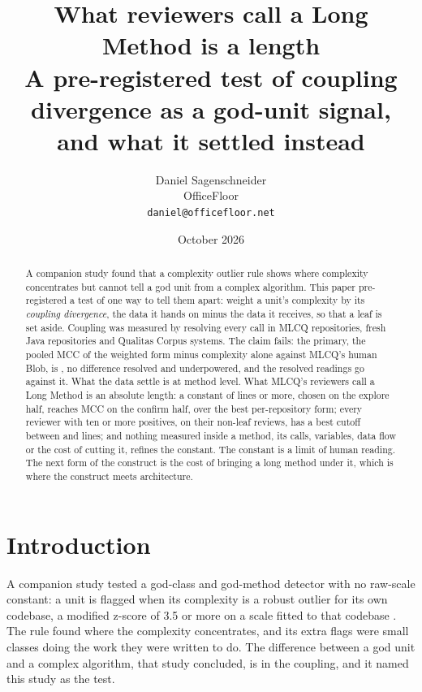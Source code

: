 \documentclass[11pt,a4paper]{article}
\title{\bfseries What reviewers call a Long Method is a length\\ A pre-registered test of coupling divergence as a god-unit signal, and what it settled instead}
\author{Daniel Sagenschneider\\\small OfficeFloor\\\small\texttt{daniel@officefloor.net}\doiline}
\date{October 2026}
\begin{document}
\maketitle

\begin{abstract}
\noindent
A companion study found that a complexity outlier rule shows where
complexity concentrates but cannot tell a god unit from a complex
algorithm. This paper pre-registered a test of one way to tell them apart:
weight a unit's complexity by its \emph{coupling divergence}, the data it
hands on minus the data it receives, so that a leaf is set aside. Coupling
was measured by resolving every call in \mlcqMeasured{} MLCQ repositories,
\seedThreeMeasured{} fresh Java repositories and \fontanaSystems{} Qualitas
Corpus systems. The claim fails: the primary, the pooled MCC of the
weighted form minus complexity alone against MLCQ's human Blob, is
\primMicro{}, no difference resolved and underpowered, and the resolved
readings go against it. What the data settle is at method level. What
MLCQ's reviewers call a Long Method is an absolute length: a constant of
\lwLengthCutoff{} lines or more, chosen on the explore half, reaches MCC
\lwLengthMccConfirm{} on the confirm half, \lwLengthVsRule{} over the best
per-repository form; every reviewer with ten or more positives, on their
non-leaf reviews, has a best cutoff between \revCutoffMin{} and
\revCutoffMax{} lines; and nothing
measured inside a method, its calls, variables, data flow or the cost of
cutting it, refines the constant. The constant is a limit of human reading.
The next form of the construct is the cost of bringing a long method under
it, which is where the construct meets architecture.
\end{abstract}

\section{Introduction}

A companion study \cite{paperone} tested a god-class and god-method
detector with no raw-scale constant: a unit is flagged when its complexity
is a robust outlier for its own codebase, a modified z-score of 3.5 or more
on a scale fitted to that codebase \cite{iglewicz1993}. The rule found
where the complexity concentrates, and its extra flags were small classes
doing the work they were written to do. The difference between a god unit
and a complex algorithm, that study concluded, is in the coupling, and it
named this study as the test.
\end{document}
